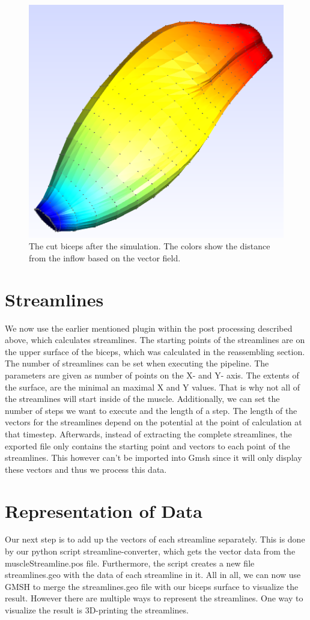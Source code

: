 \documentclass[preprint,journal]{vgtc}       %
\begin{document}
\begin{figure}
	\begin{center}
		\includegraphics[width=.7\linewidth]{Sim.png}
	\end{center}
	\caption{The cut biceps after the simulation. The colors show the distance from the inflow based on the vector field.}
	\label{fig:sim}
\end{figure}

\section{Streamlines}
We now use the earlier mentioned plugin within the post processing described above, which calculates streamlines. 
The starting points of the streamlines are on the upper surface of the biceps, which was calculated in the reassembling section. 
The number of streamlines can be set when executing the pipeline.
The parameters are given as number of points on the X- and Y- axis. 
The extents of the surface, are the minimal an maximal X and Y values. 
That is why not all of the streamlines will start inside of the muscle. 
Additionally, we can set the number of steps we want to execute  and the length of a step.
The length of the vectors for the streamlines depend on the potential at the point of calculation at that timestep.
Afterwards, instead of extracting the complete streamlines, the exported file only contains the starting point and vectors to each point of the streamlines. 
This however can't be imported into Gmsh since it will only display these vectors and thus we process this data. 

\section{Representation of Data}
Our next step is to add up the vectors of each streamline separately. 
This is done by our python script streamline-converter, which gets the vector data from the muscleStreamline.pos file. 
Furthermore, the script creates a new file streamlines.geo with the data of each streamline in it. 
All in all, we can now use GMSH to merge the streamlines.geo file with our biceps surface to visualize the result. 
However there are multiple ways to represent the streamlines. 
One way to visualize the result is 3D-printing the streamlines.
\end{document}
